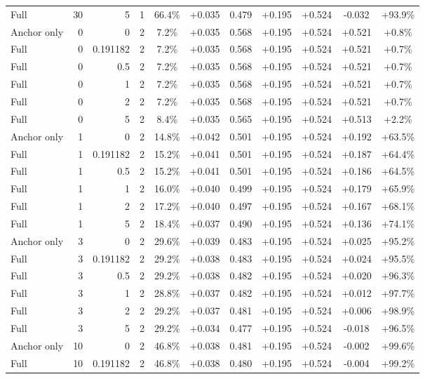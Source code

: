 \begin{table}[htbp]
\begin{tabular}{lrrrccccccc}
Full & 30 & 5 & 1 & 66.4\% & +0.035 & 0.479 & +0.195 & +0.524 & -0.032 & +93.9\% \\
Anchor only & 0 & 0 & 2 & 7.2\% & +0.035 & 0.568 & +0.195 & +0.524 & +0.521 & +0.8\% \\
Full & 0 & 0.191182 & 2 & 7.2\% & +0.035 & 0.568 & +0.195 & +0.524 & +0.521 & +0.7\% \\
Full & 0 & 0.5 & 2 & 7.2\% & +0.035 & 0.568 & +0.195 & +0.524 & +0.521 & +0.7\% \\
Full & 0 & 1 & 2 & 7.2\% & +0.035 & 0.568 & +0.195 & +0.524 & +0.521 & +0.7\% \\
Full & 0 & 2 & 2 & 7.2\% & +0.035 & 0.568 & +0.195 & +0.524 & +0.521 & +0.7\% \\
Full & 0 & 5 & 2 & 8.4\% & +0.035 & 0.565 & +0.195 & +0.524 & +0.513 & +2.2\% \\
Anchor only & 1 & 0 & 2 & 14.8\% & +0.042 & 0.501 & +0.195 & +0.524 & +0.192 & +63.5\% \\
Full & 1 & 0.191182 & 2 & 15.2\% & +0.041 & 0.501 & +0.195 & +0.524 & +0.187 & +64.4\% \\
Full & 1 & 0.5 & 2 & 15.2\% & +0.041 & 0.501 & +0.195 & +0.524 & +0.186 & +64.5\% \\
Full & 1 & 1 & 2 & 16.0\% & +0.040 & 0.499 & +0.195 & +0.524 & +0.179 & +65.9\% \\
Full & 1 & 2 & 2 & 17.2\% & +0.040 & 0.497 & +0.195 & +0.524 & +0.167 & +68.1\% \\
Full & 1 & 5 & 2 & 18.4\% & +0.037 & 0.490 & +0.195 & +0.524 & +0.136 & +74.1\% \\
Anchor only & 3 & 0 & 2 & 29.6\% & +0.039 & 0.483 & +0.195 & +0.524 & +0.025 & +95.2\% \\
Full & 3 & 0.191182 & 2 & 29.2\% & +0.038 & 0.483 & +0.195 & +0.524 & +0.024 & +95.5\% \\
Full & 3 & 0.5 & 2 & 29.2\% & +0.038 & 0.482 & +0.195 & +0.524 & +0.020 & +96.3\% \\
Full & 3 & 1 & 2 & 28.8\% & +0.037 & 0.482 & +0.195 & +0.524 & +0.012 & +97.7\% \\
Full & 3 & 2 & 2 & 29.2\% & +0.037 & 0.481 & +0.195 & +0.524 & +0.006 & +98.9\% \\
Full & 3 & 5 & 2 & 29.2\% & +0.034 & 0.477 & +0.195 & +0.524 & -0.018 & +96.5\% \\
Anchor only & 10 & 0 & 2 & 46.8\% & +0.038 & 0.481 & +0.195 & +0.524 & -0.002 & +99.6\% \\
Full & 10 & 0.191182 & 2 & 46.8\% & +0.038 & 0.480 & +0.195 & +0.524 & -0.004 & +99.2\% \\

\end{tabular}
\end{table}
